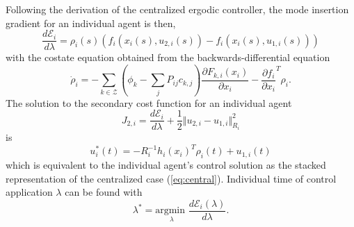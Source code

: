 \documentclass[conference]{IEEEtran}
\begin{document}
Following the derivation of the centralized ergodic controller, the mode insertion gradient for an individual agent is then,
\begin{equation*}
\frac{d \mathcal{E}_i}{d \lambda} = \rho_i(s) (f_i(x_i(s), u_{2,i}(s)) - f_i(x_i(s), u_{1,i}(s)))
\end{equation*}
with the costate equation obtained from the backwards-differential equation
\begin{equation*}
\dot{\rho}_i = - \sum_{k \in \mathcal{Z}}(\phi_k - \sum_j P _{ij} c_{k,j}) \frac{\partial F_{k,i}(x_i)}{\partial x_i} - \frac{\partial f_i}{\partial x_i }^T \rho_i.
\end{equation*}
The solution to the secondary cost function for an individual agent
\begin{equation*}
J_{2,i} = \frac{d \mathcal{E}_i}{d \lambda} + \frac{1}{2} \Vert u_{2,i} - u_{1,i}\Vert ^2_{R_i}
\end{equation*}
is
\begin{equation}
u^*_i(t) = -R_i^{-1} h_i(x_i)^T \rho_i(t) + u_{1,i}(t)
\end{equation}
which is equivalent to the individual agent's control solution as the stacked representation of the centralized case (\ref{eq:central}). Individual time of control application $\lambda$ can be found with
\begin{equation*}
\lambda ^*= \underset{\lambda}{\text{argmin }} \frac{d\mathcal{E}_i (\lambda)}{d\lambda} .
\end{equation*}
\end{document}
